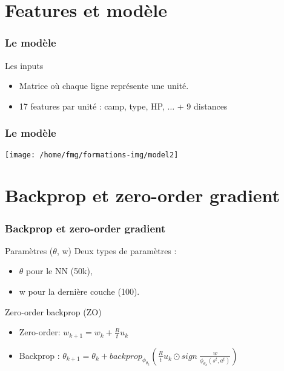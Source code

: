 \documentclass[smaller]{beamer}
\begin{document}

\section{Features et modèle}

\begin{frame}
  \frametitle{Le modèle}

  \begin{block}{Les inputs}
    \begin{itemize}
    \item Matrice où chaque ligne représente une unité.
    \item 17 features par unité : camp, type, HP, $\ldots$ + 9 distances
    \end{itemize}
  \end{block}
  
\end{frame}


\begin{frame}
  \frametitle{Le modèle}

  \centerline{\texttt{[image: /home/fmg/formations-img/model2]}}  

\end{frame}


\section{Backprop et zero-order gradient}

\begin{frame}
  \frametitle{Backprop et zero-order gradient}

  \begin{block}{Paramètres ($\theta$, w)}
    Deux types de paramètres :
    \begin{itemize}
    \item $\theta$ pour le NN (50k),
    \item w pour la dernière couche (100).
    \end{itemize}
  \end{block}
  
  \bigskip

  \begin{exampleblock}{Zero-order backprop (ZO)}
    \begin{itemize}
    \item Zero-order: $w_{k+1} = w_k + \frac{R}{t}u_k$
    \item    Backprop   :    $\theta_{k+1}   =    \theta_k   +  backprop_{\phi_{\theta_k}}\left(\frac{R}{t}u_k \odot sign\ \frac{w}{\phi_{\theta_k}(s^t,a^t)}\right)$
    \end{itemize}
  \end{exampleblock}

\end{frame}
\end{document}
